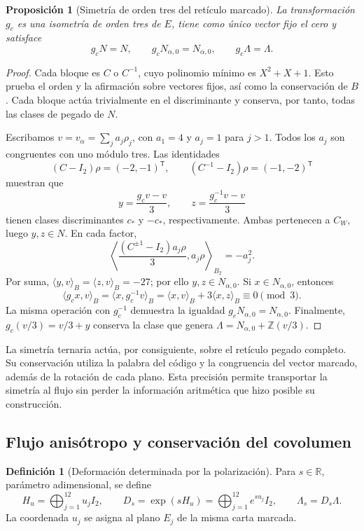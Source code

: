 \documentclass[a4paper,10pt]{article}
\newtheorem{proposition}[theorem]{Proposición}
\theoremstyle{definition}\newtheorem{definition}[theorem]{Definición}
\theoremstyle{remark}\newtheorem{remark}[theorem]{Observación}
\numberwithin{equation}{section}
\begin{document}
\begin{proposition}[Simetría de orden tres del retículo marcado]
\label{prop:leech-c3}
La transformación \(g_c\) es una isometría de orden tres de \(E\),
tiene como único vector fijo el cero y satisface
\[
 g_cN=N,\qquad g_cN_{\alpha,0}=N_{\alpha,0},
 \qquad g_c\Lambda=\Lambda.
\]
\end{proposition}
\begin{proof}
Cada bloque es \(C\) o \(C^{-1}\), cuyo polinomio mínimo es
\(X^2+X+1\). Esto prueba el orden y la afirmación sobre vectores fijos,
así como la conservación de \(B\). Cada bloque actúa trivialmente en
el discriminante y conserva, por tanto, todas las clases de pegado de
\(N\).

Escribamos \(v=v_\alpha=\sum_j a_j\rho_j\), con \(a_1=4\) y
\(a_j=1\) para \(j>1\). Todos los \(a_j\) son congruentes con uno
módulo tres. Las identidades
\[
 (C-I_2)\rho=(-2,-1)^{\mathsf T},
 \qquad (C^{-1}-I_2)\rho=(-1,-2)^{\mathsf T}
\]
muestran que
\[
 y=\frac{g_cv-v}{3},\qquad z=\frac{g_c^{-1}v-v}{3}
\]
tienen clases discriminantes \(c_*\) y \(-c_*\), respectivamente.
Ambas pertenecen a \(C_W\), luego \(y,z\in N\). En cada factor,
\[
 \left\langle
 \frac{(C^{\pm1}-I_2)a_j\rho}{3},a_j\rho
 \right\rangle_{B_2}=-a_j^2.
\]
Por suma, \(\langle y,v\rangle_B=\langle z,v\rangle_B=-27\);
por ello \(y,z\in N_{\alpha,0}\).
Si \(x\in N_{\alpha,0}\), entonces
\[
 \langle g_cx,v\rangle_B
  =\langle x,g_c^{-1}v\rangle_B
  =\langle x,v\rangle_B+3\langle x,z\rangle_B
  \equiv0\pmod3.
\]
La misma operación con \(g_c^{-1}\) demuestra la igualdad
\(g_cN_{\alpha,0}=N_{\alpha,0}\). Finalmente,
\(g_c(v/3)=v/3+y\) conserva la clase que genera
\(\Lambda=N_{\alpha,0}+\mathbb Z(v/3)\).
\end{proof}

La simetría ternaria actúa, por consiguiente, sobre el retículo
pegado completo. Su conservación utiliza la palabra del código y
la congruencia del vector marcado, además de la rotación de cada
plano. Esta precisión permite transportar la simetría al flujo sin
perder la información aritmética que hizo posible su construcción.

\subsection{Flujo anisótropo y conservación del covolumen}
\label{subsec:leech-flow}

\begin{definition}[Deformación determinada por la polarización]
Para \(s\in\mathbb R\), parámetro adimensional, se define
\begin{equation}
 H_u=\bigoplus_{j=1}^{12}u_jI_2,\qquad
 D_s=\exp(sH_u)=\bigoplus_{j=1}^{12}e^{su_j}I_2,\qquad
 \Lambda_s=D_s\Lambda.
 \label{eq:leech-flow}
\end{equation}
La coordenada \(u_j\) se asigna al plano \(E_j\) de la misma carta
marcada.
\end{definition}
\end{document}
